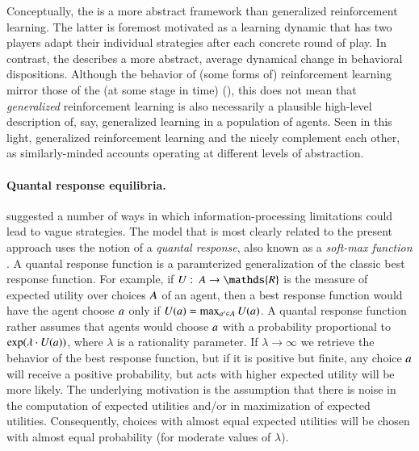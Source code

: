 \documentclass[fleqn,reqno,10pt]{article}
\newcommand{\rd}{\acro{rd}} %
\newcommand{\rdd}{\acro{rdd}} %
\begin{document}
Conceptually, the \rdd is a more abstract framework than generalized
reinforcement learning. The latter is foremost motivated as a learning
dynamic that has two players adapt their individual strategies after
each concrete round of play. In contrast, the \rdd describes a more
abstract, average dynamical change in behavioral
dispositions. Although the behavior of (some forms of) reinforcement
learning mirror those of the \rd (at some stage in time)
(\cite{BorgersSarin997:Learning-Throug,HopkinsPosch2005:Attainability-o,Beggs2005:On-the-Converge}),
this does not mean that \emph{generalized} reinforcement learning is
also necessarily a plausible high-level description of, say,
generalized learning in a population of agents. Seen in this light,
generalized reinforcement learning and the \rdd nicely complement each
other, as similarly-minded accounts operating at different levels of
abstraction.

\paragraph{Quantal response equilibria.}
\citet{FrankeJager2010:Vagueness-Signa} suggested a number of ways in
which information-processing limitations could lead to vague
strategies. The model that is most clearly related to the present
approach uses the notion of a \emph{quantal response}, also known as a
\emph{soft-max function}
\citep[e.g.][]{Luce1959:Individual-Choi,McFadden1976:Quantal-Choice-,GoereeHolt2008:Quantal-Respons}. A
quantal response function is a paramterized generalization of the
classic best response function. For example, if $U \mycolon \Acts
\rightarrow \mathds{R}$ is the measure of expected utility over
choices $A$ of an agent, then a best response function would have
the agent choose $a$ only if $U(a) = \max_{a' \in A}
U(a)$. A quantal response function rather assumes that agents would
choose $a$ with a probability proportional to $\operatorname{exp}(\lambda \cdot
U(a))$, where $\lambda$ is a rationality parameter. If $\lambda
\rightarrow \infty$ we retrieve the behavior of the best response
function, but if it is positive but finite, any choice $a$ will
receive a positive probability, but acts with higher expected utility
will be more likely. The underlying motivation is the assumption that
there is noise in the computation of expected utilities and/or in
maximization of expected utilities. Consequently, choices with almost
equal expected utilities will be chosen with almost equal probability
(for moderate values of $\lambda$).
\end{document}
